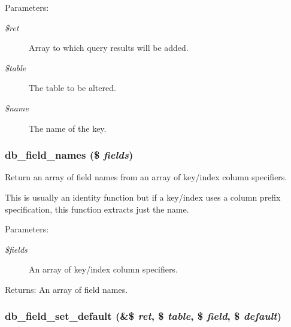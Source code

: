 \begin{Desc}
\item[Parameters:]
\begin{description}
\item[{\em \$ret}]Array to which query results will be added. \item[{\em \$table}]The table to be altered. \item[{\em \$name}]The name of the key. \end{description}
\end{Desc}
\hypertarget{group__schemaapi_geb423ba53e5133548abe3d999f86e787}{
\subsubsection[{db\_\-field\_\-names}]{\setlength{\rightskip}{0pt plus 5cm}db\_\-field\_\-names (\$ {\em fields})}}
\label{group__schemaapi_geb423ba53e5133548abe3d999f86e787}


Return an array of field names from an array of key/index column specifiers.

This is usually an identity function but if a key/index uses a column prefix specification, this function extracts just the name.

\begin{Desc}
\item[Parameters:]
\begin{description}
\item[{\em \$fields}]An array of key/index column specifiers. \end{description}
\end{Desc}
\begin{Desc}
\item[Returns:]An array of field names. \end{Desc}
\hypertarget{group__schemaapi_gf5a1ae05cf11189bc6e0f6a8ed2b7701}{
\subsubsection[{db\_\-field\_\-set\_\-default}]{\setlength{\rightskip}{0pt plus 5cm}db\_\-field\_\-set\_\-default (\&\$ {\em ret}, \/  \$ {\em table}, \/  \$ {\em field}, \/  \$ {\em default})}}
\label{group__schemaapi_gf5a1ae05cf11189bc6e0f6a8ed2b7701}


